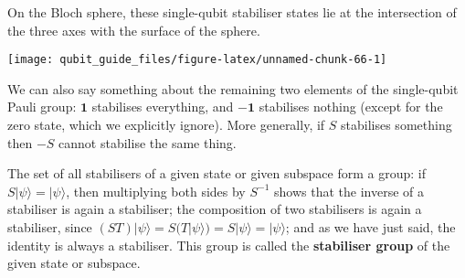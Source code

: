 \documentclass[fleqn]{article}
\begin{document}
On the Bloch sphere, these single-qubit stabiliser states lie at the intersection of the three axes with the surface of the sphere.

\begin{center}\texttt{[image: qubit\_guide\_files/figure-latex/unnamed-chunk-66-1]} \end{center}

We can also say something about the remaining two elements of the single-qubit Pauli group: \(\mathbf{1}\) stabilises everything, and \(-\mathbf{1}\) stabilises nothing (except for the zero state, which we explicitly ignore).
More generally, if \(S\) stabilises something then \(-S\) cannot stabilise the same thing.

The set of all stabilisers of a given state or given subspace form a group: if \(S|\psi\rangle=|\psi\rangle\), then multiplying both sides by \(S^{-1}\) shows that the inverse of a stabiliser is again a stabiliser; the composition of two stabilisers is again a stabiliser, since \((ST)|\psi\rangle=S(T|\psi\rangle)=S|\psi\rangle=|\psi\rangle\); and as we have just said, the identity is always a stabiliser.
This group is called the \textbf{stabiliser group} of the given state or subspace.
\end{document}
